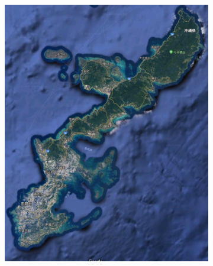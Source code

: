 \begin{figure}
  \begin{subfigure}{.25\textwidth}
    \includegraphics[width=\textwidth]{pics/okinawa.png}
    \caption{}
    \label{fig:okinawa}
  \end{subfigure}
  \begin{subfigure}{.25\textwidth}

\end{subfigure}
\end{figure}
